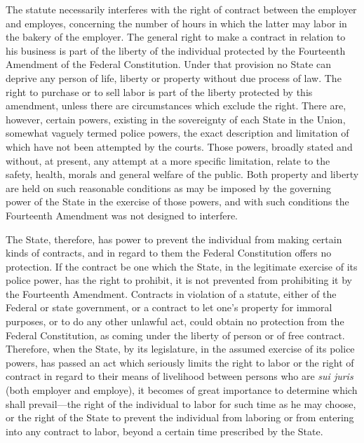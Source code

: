 \documentclass[
  letterpaper,
  11pt,
  DIV=9,
  openright]{scrbook}
\begin{document}
The statute necessarily interferes with the right of contract between
the employer and employes, concerning the number of hours in which the
latter may labor in the bakery of the employer. The general right to
make a contract in relation to his business is part of the liberty of
the individual protected by the Fourteenth Amendment of the Federal
Constitution. Under that provision no State can deprive any person of
life, liberty or property without due process of law. The right to
purchase or to sell labor is part of the liberty protected by this
amendment, unless there are circumstances which exclude the right. There
are, however, certain powers, existing in the sovereignty of each State
in the Union, somewhat vaguely termed police powers, the exact
description and limitation of which have not been attempted by the
courts. Those powers, broadly stated and without, at present, any
attempt at a more specific limitation, relate to the safety, health,
morals and general welfare of the public. Both property and liberty are
held on such reasonable conditions as may be imposed by the governing
power of the State in the exercise of those powers, and with such
conditions the Fourteenth Amendment was not designed to interfere.

The State, therefore, has power to prevent the individual from making
certain kinds of contracts, and in regard to them the Federal
Constitution offers no protection. If the contract be one which the
State, in the legitimate exercise of its police power, has the right to
prohibit, it is not prevented from prohibiting it by the Fourteenth
Amendment. Contracts in violation of a statute, either of the Federal or
state government, or a contract to let one's property for immoral
purposes, or to do any other unlawful act, could obtain no protection
from the Federal Constitution, as coming under the liberty of person or
of free contract. Therefore, when the State, by its legislature, in the
assumed exercise of its police powers, has passed an act which seriously
limits the right to labor or the right of contract in regard to their
means of livelihood between persons who are \emph{sui juris} (both
employer and employe), it becomes of great importance to determine which
shall prevail---the right of the individual to labor for such time as he
may choose, or the right of the State to prevent the individual from
laboring or from entering into any contract to labor, beyond a certain
time prescribed by the State.
\end{document}
